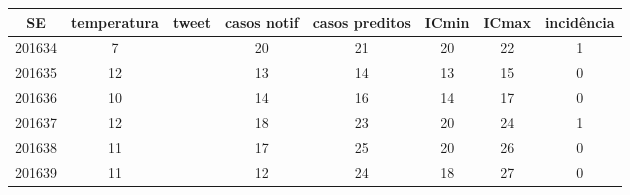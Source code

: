 \begin{tabular}{c|ccccccc}
  \hline
SE & temperatura & tweet & casos notif & casos preditos & ICmin & ICmax & incidência \\ 
  \hline
201634 & 7 &  & 20 & 21 & 20 & 22 & 1 \\ 
  201635 & 12 &  & 13 & 14 & 13 & 15 & 0 \\ 
  201636 & 10 &  & 14 & 16 & 14 & 17 & 0 \\ 
  201637 & 12 &  & 18 & 23 & 20 & 24 & 1 \\ 
  201638 & 11 &  & 17 & 25 & 20 & 26 & 0 \\ 
  201639 & 11 &  & 12 & 24 & 18 & 27 & 0 \\ 
   \hline
\end{tabular}
